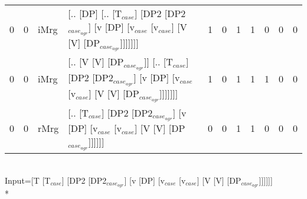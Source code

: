 \begin{tabularx}{\linewidth}{rrlXrrrrrrr}
   0 &   0 & iMrg & [.. [DP] [.. [T$_{case}$] [DP2 [DP2$_{case_{agr}}$] [v [DP] [v$_{case}$ [v$_{case}$] [V [V] [DP$_{case_{agr}}$]]]]]]]                                                                  &            1 &              0 &             1 &             1 &                  0 &            0 &              0 \\
   0 &   0 & iMrg & [.. [V [V] [DP$_{case_{agr}}$]] [.. [T$_{case}$] [DP2 [DP2$_{case_{agr}}$] [v [DP] [v$_{case}$ [v$_{case}$] [V [V] [DP$_{case_{agr}}$]]]]]]]                                                 &            1 &              0 &             1 &             1 &                  1 &            0 &              0 \\
   0 &   0 & rMrg & [.. [T$_{case}$] [DP2 [DP2$_{case_{agr}}$] [v [DP] [v$_{case}$ [v$_{case}$] [V [V] [DP$_{case_{agr}}$]]]]]]                                                                            &            0 &              0 &             1 &             1 &                  0 &            0 &              0 \\
\hline
\end{tabularx}\endgroup\\
\begingroup\scriptsize Input=[T [T$_{case}$] [DP2 [DP2$_{case_{agr}}$] [v [DP] [v$_{case}$ [v$_{case}$] [V [V] [DP$_{case_{agr}}$]]]]]]\\*
